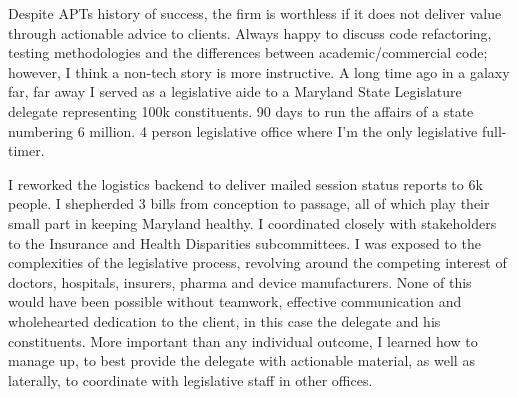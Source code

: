 \documentclass[a4paper]{../res}
\begin{document}
\begin{sloppypar}
\begin{resume}

Despite APTs history of success, the firm is worthless if it does not deliver value through actionable advice to clients. Always happy to discuss code refactoring, testing methodologies and the differences between academic/commercial code; however, I think a non-tech story is more instructive. A long time ago in a galaxy far, far away I served as a legislative aide to a Maryland State Legislature delegate representing 100k constituents. 90 days to run the affairs of a state numbering 6 million. 4 person legislative office where I'm the only legislative full-timer.

I reworked the logistics backend to deliver mailed session status reports to 6k people. I shepherded 3 bills from conception to passage, all of which play their small part in keeping Maryland healthy. I coordinated closely with stakeholders to the Insurance and Health Disparities subcommittees. I was exposed to the complexities of the legislative process, revolving around the competing interest of doctors, hospitals, insurers, pharma and device manufacturers. None of this would have been possible without teamwork, effective communication and wholehearted dedication to the client, in this case the delegate and his constituents. More important than any individual outcome, I learned how to manage up, to best provide the delegate with actionable material, as well as laterally, to coordinate with legislative staff in other offices.






\end{resume}
\end{sloppypar}
\end{document}
